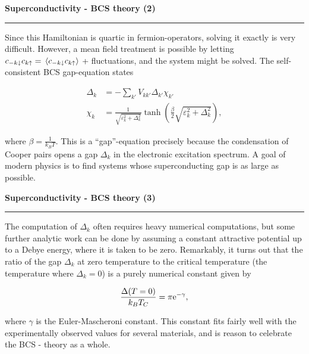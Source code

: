 \begin{frame}
	\begin{block}{\color{white}\textbf{\Large{
					Superconductivity - BCS theory (2)
		}}}
		\vspace{-10pt}\rule{\textwidth}{0.5pt}
		\color{white}
		Since this Hamiltonian is quartic in fermion-operators, solving it exactly is very difficult. However, a mean field treatment is possible by letting $c_{-k\downarrow}c_{k\uparrow} = \ev*{c_{-k\downarrow}c_{k\uparrow}}$ + fluctuations, and the system might be solved. The self-consistent BCS gap-equation states
		
	\end{block}
	{
			\begin{align*}
					\Delta_k &= -\sum_{k'}V_{kk'}\Delta_{k'}\chi_{k'} \\
					\chi_{k} &= \frac{1}{\sqrt{\varepsilon_k^2 + \Delta_k^2}}\tanh(\frac{\beta}{2}\sqrt{\varepsilon_k^2 + \Delta_k^2}),
			\end{align*}

	}
	
	\begin{block}{}
		\color{white}
		where $\beta = \frac{1}{k_BT}$.
		This is a ``gap''-equation precisely because the condensation of Cooper pairs opens a gap $\Delta_k$ in the electronic excitation spectrum. A goal of modern physics is to find systems whose superconducting gap is as large as possible. 
		
		
	\end{block}
	
	
\end{frame}


\begin{frame}
	\begin{block}{\color{white}\textbf{\Large{
					Superconductivity - BCS theory (3)
		}}}
		\vspace{-10pt}\rule{\textwidth}{0.5pt}
		\color{white}
		
		The computation of $\Delta_k$ often requires heavy numerical computations, but some further analytic work can be done by assuming a constant attractive potential up to a Debye energy, where it is taken to be zero. 
		Remarkably, it turns out that the ratio of the gap $\Delta_k$ at zero temperature to the critical temperature (the temperature where $\Delta_k = 0$) is a purely numerical constant given by
		
	\end{block}
	{
		\begin{equation*} 
			\frac{\Delta(T=0)}{k_B T_C} = \pi\mathrm{e}^{-\gamma}, 
		\end{equation*}
	}
	
	\begin{block}{}
		\color{white}
		where $\gamma$ is the Euler-Mascheroni constant. This constant fits fairly well with the experimentally observed values for several materials, and is reason to celebrate the BCS - theory as a whole. 
		
		
	\end{block}
	
	
\end{frame}